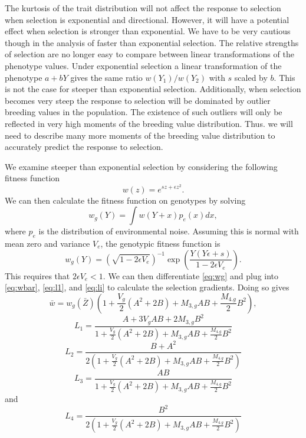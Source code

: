 The kurtosis of the trait distribution will not affect the response to selection
when selection is exponential and directional. However, it will have a potential
effect when selection is stronger than exponential. We have to be very cautious
though in the analysis of faster than exponential selection. The relative
strengths of selection are no longer easy to compare between linear
transformations of the phenotype values. Under exponential selection a linear
transformation of the phenotype $a + bY$ gives the same ratio $w(Y_1)/w(Y_2)$
with $s$ scaled by $b$. This is not the case for steeper than exponential
selection. Additionally, when selection becomes very steep the response to
selection will be dominated by outlier breeding values in the population. The
existence of such outliers will only be reflected in very high moments of the
breeding value distribution. Thus. we will need to describe many more moments of
the breeding value distribution to accurately predict the response to selection.

We examine steeper than exponential selection by considering the following
fitness function
\begin{equation}
  \label{eq:gexpsel}
  w(z) = e^{sz + \epsilon z^2}.
\end{equation}
We can then calculate the fitness function on genotypes by solving
\begin{equation*}
  w_g(Y) = \int w(Y + x)p_e(x)dx,
\end{equation*}
where $p_e$ is the distribution of environmental noise. Assuming this is normal
with mean zero and variance $V_e$, the genotypic fitness function is
\begin{equation}
  \label{eq:wg}
  w_g(Y) = \left( \sqrt{1-2\epsilon V_e} \right)^{-1}
  \exp\left( \frac{Y(Y\epsilon + s)}{1-2\epsilon V_e}\right).
\end{equation}
This requires that $2\epsilon V_e < 1$. We can then differentiate \eqref{eq:wg}
and plug into \eqref{eq:wbar}, \eqref{eq:l1}, and \eqref{eq:li} to calculate the
selection gradients. Doing so gives
\newcommand{\wdenom}{1 + \frac{V_g}{2}\left( A^2 + 2B \right) + M_{3,g}AB + \frac{M_{4.g}}{2}B^2}
\begin{equation}
  \bar{w} = w_g(\bar{Z})\left( 1 + \frac{V_g}{2}\left( A^2 + 2B \right) +
  M_{3,g}AB + \frac{M_{4.g}}{2}B^2\right),
\end{equation}
\begin{equation}
  L_1 = \frac{A + 3V_gAB + 2M_{3,g}B^2}{\wdenom}
\end{equation}
\begin{equation}
  L_2 = \frac{B+A^2}{2\left(\wdenom\right)}
\end{equation}
\begin{equation}
  L_3 = \frac{AB}{\wdenom}
\end{equation}
and
\begin{equation}
  L_4 = \frac{B^2}{2\left(\wdenom\right)}
\end{equation}

